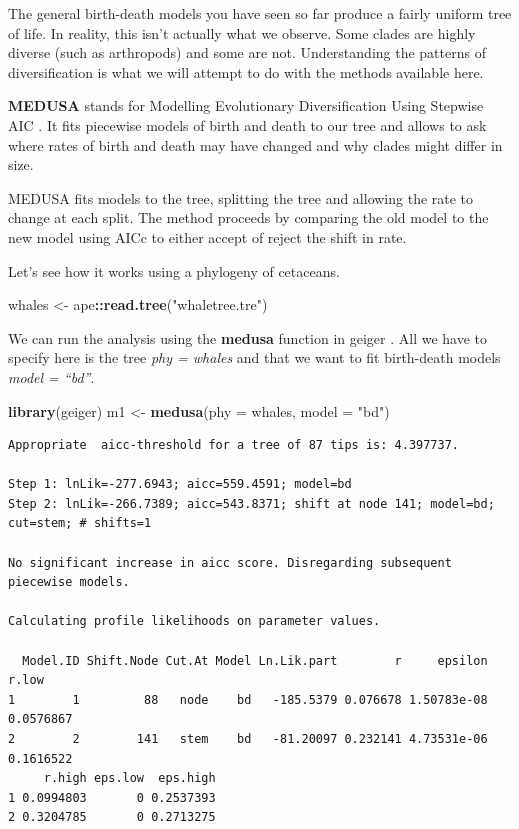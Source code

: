 \documentclass[
]{book}
\newenvironment{Shaded}{\begin{snugshade}}{\end{snugshade}}
\newcommand{\DataTypeTok}[1]{\textcolor[rgb]{0.13,0.29,0.53}{#1}}
\newcommand{\KeywordTok}[1]{\textcolor[rgb]{0.13,0.29,0.53}{\textbf{#1}}}
\newcommand{\NormalTok}[1]{#1}
\newcommand{\OperatorTok}[1]{\textcolor[rgb]{0.81,0.36,0.00}{\textbf{#1}}}
\newcommand{\StringTok}[1]{\textcolor[rgb]{0.31,0.60,0.02}{#1}}
\begin{document}
The general birth-death models you have seen so far produce a fairly uniform tree of life. In reality, this isn't actually what we observe. Some clades are highly diverse (such as arthropods) and some are not. Understanding the patterns of diversification is what we will attempt to do with the methods available here.

\textbf{MEDUSA} stands for Modelling Evolutionary Diversification Using Stepwise AIC \citep{Alfaro09}. It fits piecewise models of birth and death to our tree and allows to ask where rates of birth and death may have changed and why clades might differ in size.

MEDUSA fits models to the tree, splitting the tree and allowing the rate to change at each split. The method proceeds by comparing the old model to the new model using AICc to either accept of reject the shift in rate.

Let's see how it works using a phylogeny of cetaceans.

\begin{Shaded}
\begin{Highlighting}[]
\NormalTok{whales \textless{}{-}}\StringTok{ }\NormalTok{ape}\OperatorTok{::}\KeywordTok{read.tree}\NormalTok{(}\StringTok{"whaletree.tre"}\NormalTok{)}
\end{Highlighting}
\end{Shaded}

We can run the analysis using the \textbf{medusa} function in geiger \citep{geiger}. All we have to specify here is the tree \emph{phy = whales} and that we want to fit birth-death models \emph{model = ``bd''}.

\begin{Shaded}
\begin{Highlighting}[]
\KeywordTok{library}\NormalTok{(geiger)}
\NormalTok{m1 \textless{}{-}}\StringTok{ }\KeywordTok{medusa}\NormalTok{(}\DataTypeTok{phy =}\NormalTok{ whales, }\DataTypeTok{model =} \StringTok{"bd"}\NormalTok{)}
\end{Highlighting}
\end{Shaded}

\begin{verbatim}
Appropriate  aicc-threshold for a tree of 87 tips is: 4.397737.

Step 1: lnLik=-277.6943; aicc=559.4591; model=bd
Step 2: lnLik=-266.7389; aicc=543.8371; shift at node 141; model=bd; cut=stem; # shifts=1

No significant increase in aicc score. Disregarding subsequent piecewise models.

Calculating profile likelihoods on parameter values.

  Model.ID Shift.Node Cut.At Model Ln.Lik.part        r     epsilon     r.low
1        1         88   node    bd   -185.5379 0.076678 1.50783e-08 0.0576867
2        2        141   stem    bd   -81.20097 0.232141 4.73531e-06 0.1616522
     r.high eps.low  eps.high
1 0.0994803       0 0.2537393
2 0.3204785       0 0.2713275
\end{verbatim}
\end{document}
